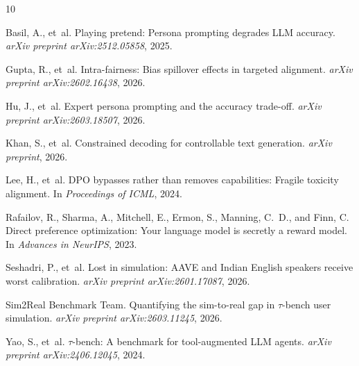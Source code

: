 \documentclass[11pt,a4paper]{article}
\begin{document}

\begin{thebibliography}{10}

Basil, A., et~al.
\newblock Playing pretend: Persona prompting degrades LLM accuracy.
\newblock \emph{arXiv preprint arXiv:2512.05858}, 2025.

Gupta, R., et~al.
\newblock Intra-fairness: Bias spillover effects in targeted alignment.
\newblock \emph{arXiv preprint arXiv:2602.16438}, 2026.

Hu, J., et~al.
\newblock Expert persona prompting and the accuracy trade-off.
\newblock \emph{arXiv preprint arXiv:2603.18507}, 2026.

Khan, S., et~al.
\newblock Constrained decoding for controllable text generation.
\newblock \emph{arXiv preprint}, 2026.

Lee, H., et~al.
\newblock DPO bypasses rather than removes capabilities: Fragile toxicity alignment.
\newblock In \emph{Proceedings of ICML}, 2024.

Rafailov, R., Sharma, A., Mitchell, E., Ermon, S., Manning, C.~D., and Finn, C.
\newblock Direct preference optimization: Your language model is secretly a reward model.
\newblock In \emph{Advances in NeurIPS}, 2023.

Seshadri, P., et~al.
\newblock Lost in simulation: AAVE and Indian English speakers receive worst calibration.
\newblock \emph{arXiv preprint arXiv:2601.17087}, 2026.

Sim2Real Benchmark Team.
\newblock Quantifying the sim-to-real gap in $\tau$-bench user simulation.
\newblock \emph{arXiv preprint arXiv:2603.11245}, 2026.

Yao, S., et~al.
\newblock $\tau$-bench: A benchmark for tool-augmented LLM agents.
\newblock \emph{arXiv preprint arXiv:2406.12045}, 2024.

\end{thebibliography}
\end{document}
